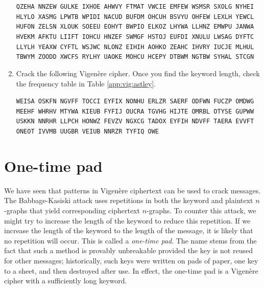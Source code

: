 \documentclass{book}
\theoremstyle{plain}
\theoremstyle{definition}
\newif\ifprintsolutions
\newcommand{\solution}[1]{\ifprintsolutions \begin{sloppypar}{\it #1}\end{sloppypar} \fi} %
\newcommand{\display}[1]{\begin{sloppypar}\setlength{\parindent}{0mm}#1\end{sloppypar}} %
\newcommand{\ciphertextspace}[1]{\begin{sloppypar}\doublespacing\Large\texttt{#1}\end{sloppypar}} %
\begin{document}
\begin{enumerate}
\display{\ciphertextspace{QZEHA NNZEW GULKE IXHOE AHWVY FTMAT VWCIE EMFEW WSMSR SXOLG NYHEI HLYLO XASMG LPWTB WPIDI NACUD BUFDM OHCUH BSVYU OHFEW LEXLH YEWCL HUFON ZELSN XLOUK SOEEU EOHYT BWPIO ELKOZ LHYWA LLHNZ EMWPU JANWA HVEKM AFKTU LIIFT IOHCU HNZEF SWMGF HSTOJ EUFDI XNULU LWSAG DYFTC LLYLH YEAXW CYFTL WSJWC NLONZ EIHIH AOHKO ZEAHC IHVRY IUCJE MLHUL TBWYM ZOODD XWCFS RYLHY UAOKE MOHCU HCEPY DTBWM NGTBW SYHAL STCGN}} \solution{Keyword USA, trigraphs NZE, TBW, LHY, FEW: When in the Course of human events, it becomes necessary for one people to dissolve the political bands which have connected them with another, and to assume among the powers of the earth, the separate and equal station to which the Laws of Nature and of Nature's God entitle them, a decent respect to the opinions of mankind requires that they should declare the causes which impel them to the separation.}
\item\label{exer:vig:astley} Crack the following Vigen\`{e}re cipher. Once you find the keyword length, check the frequency table in Table \ref{app:vig:astley}.
\display{\ciphertextspace{WEISA OSKFN NGVFF TOCCI EYFIX NONHU ERLZR SAERF ODFWN FUCZP OMDWG MEEHF WHRHV MTYWA KIEUB FYFIJ OUCRA TGVHG HIJTE OMRBL OTYSE GUPWW USKKN NNRHR LLPCH HONWZ FEVZV NGXCG TADOX EYFIH NDVFF TAERA EVVFT ONEOT IVVMB UUGBR VEIUB NNRZR TYFIQ OWE}} \solution{Keyword AARON, trigraphs YFI, VFF, EYF: We're no strangers to love; you know the rules and so do I. A full commitment's what I'm thinking of; you wouldn't get this from any other guy. I just wanna tell you how I'm feeling, gotta make you understand. Never gonna give you up, never gonna let you down.}
\end{enumerate}

\chapter{One-time pad}
We have seen that patterns in Vigen\`{e}re ciphertext can be used to crack messages. The Babbage-Kasiski attack uses repetitions in both the keyword and plaintext $n$-graphs that yield corresponding ciphertext $n$-graphs. To counter this attack, we might try to increase the length of the keyword to reduce this repetition. If we increase the length of the keyword to the length of the message, it is likely that no repetition will occur. This is called a {\it one-time pad}. The name stems from the fact that such a method is provably unbreakable provided the key is not reused for other messages; historically, such keys were written on pads of paper, one key to a sheet, and then destroyed after use. In effect, the one-time pad is a Vigen\`{e}re cipher with a sufficiently long keyword.
\end{document}
